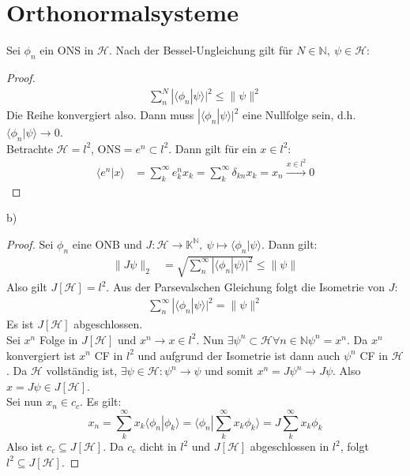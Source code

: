 \documentclass[a4paper,12pt]{article}
\newcommand{\brak}{}
\newcommand{\klam}{}
\begin{document}
\section{Orthonormalsysteme}
Sei $\phi_n$ ein ONS in $\mathcal{H}$. Nach der Bessel-Ungleichung gilt für $N\in\mathbb{N},\ \psi\in\mathcal{H}$:
\begin{proof}
\begin{align*}
\sum_n^N|\brak\langle {\phi_n}| {\psi}\rangle|^2\le \|\psi\|^2
\end{align*}
Die Reihe konvergiert also. Dann muss $|\brak\langle {\phi_n}| {\psi}\rangle|^2$ eine Nullfolge sein, d.h. $\brak\langle {\phi_n}| {\psi}\rangle\rightarrow 0$.\\
Betrachte $\mathcal{H}=l^2$, ONS$=e^n\subset l^2$. Dann gilt für ein $x\in l^2$:
\begin{align*}
\brak\langle {e^n}| {x}\rangle&=\sum_k^\infty e_k^nx_k=\sum_k^\infty \delta_{kn}x_k=x_n\overset{x\in l^2}{\rightarrow} 0
\end{align*}
\end{proof}
b)
\begin{proof}
Sei $\phi_n$ eine ONB und $J:\mathcal{H}\rightarrow\mathbb{K}^\mathbb{N},\ \psi\mapsto\brak\langle {\phi_n}| {\psi}\rangle$. Dann gilt:
\begin{align*}
\|J\psi\|_2&=\sqrt{\sum_n^\infty|\brak\langle {\phi_n}| {\psi}\rangle|^2}\le\|\psi\|
\end{align*}
Also gilt $J\klam\left[ {\mathcal{H}} \right]=l^2$. Aus der Parsevalschen Gleichung folgt die Isometrie von $J$:
\begin{align*}
\sum_n^\infty|\brak\langle {\phi_n}| {\psi}\rangle|^2=\|\psi\|^2
\end{align*}
Es ist $J\klam\left[ {\mathcal{H}} \right]$ abgeschlossen.\\
Sei $x^n$ Folge in $J\klam\left[ {\mathcal{H}} \right]$ und $x^n\rightarrow x\in l^2$. Nun $\exists\psi^n\subset\mathcal{H}\forall n\in\mathbb{N}\psi^n=x^n$. Da $x^n$ konvergiert ist $x^n$ CF in $l^2$ und aufgrund der Isometrie ist dann auch $\psi^n$ CF in $\mathcal{H}$. Da $\mathcal{H}$ vollständig ist, $\exists\psi\in\mathcal{H}:\psi^n\rightarrow \psi$ und somit $x^n=J\psi^n\rightarrow J\psi$. Also $x=J\psi\in J\klam\left[ {\mathcal{H}} \right]$.\\
Sei nun $x_n\in c_c$. Es gilt:
$$x_n=\sum_k^\infty x_k\brak\langle {\phi_n}| {\phi_k}\rangle=\brak\langle {\phi_n}| {\sum_k^\infty x_k\phi_k}\rangle=J\sum_k^\infty x_k\phi_k$$
Also ist $c_c\subseteq J\klam\left[ {\mathcal{H}} \right]$. Da $c_c$ dicht in $l^2$ und $J\klam\left[ {\mathcal{H}} \right]$ abgeschlossen in $l^2$, folgt $l^2\subseteq J\klam\left[ {\mathcal{H}} \right]$.
\end{proof}
\end{document}
